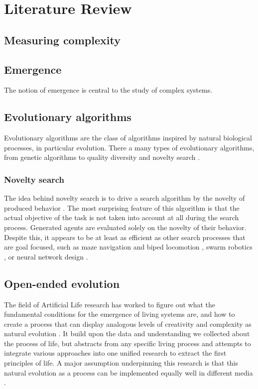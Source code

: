 \chapter{Literature Review}
\label{cha:literature-review}

\section{Measuring complexity}

\section{Emergence}
The notion of emergence is central to the study of complex systems.

\section{Evolutionary algorithms}
Evolutionary algorithms are the class of algorithms inspired by natural
biological processes, in particular evolution. There a many types of
evolutionary algorithms, from genetic algorithms to quality diversity and
novelty search \parencite{lehmanAbandoningObjectivesEvolution2011,
  lehmanEvolvingDiversityVirtual2011}.

\subsection{Novelty search}
The idea behind novelty search is to drive a search algorithm by the novelty of
produced behavior \parencite{lehmanAbandoningObjectivesEvolution2011}. The most
surprising feature of this algorithm is that the actual objective of the task is
not taken into account at all during the search process. Generated agents are
evaluated solely on the novelty of their behavior. Despite this, it appears to
be at least as efficient as other search processes that are goal focused, such
as maze navigation and biped locomotion
\parencite{lehmanAbandoningObjectivesEvolution2011}, swarm robotics
\parencite{gomesEvolutionSwarmRobotics2013}, or neural network design
\parencite{risiEvolvingPlasticNeural2010}.

\section{Open-ended evolution}
The field of Artificial Life research has worked to figure out what the
fundamental conditions for the emergence of living systems are, and how to
create a process that can display analogous levels of creativity and complexity
as natural evolution \parencite{eigenHypercycle1979,
  langtonArtificialLifeProceedings1989, dysonOriginsLife1999,
  stanleyWhyOpenEndednessMatters2019, packardOverviewOpenEndedEvolution2019,
  sorosOpenendednessLastGrand2017}. It build upon the data and understanding we
collected about the process of life, but abstracts from any specific living
process and attempts to integrate various approaches into one unified research
to extract the first principles of life. A major assumption underpinning this
research is that this natural evolution as a process can be implemented equally
well in different media \parencite{dennettDarwinDangerousIdea1996}.

